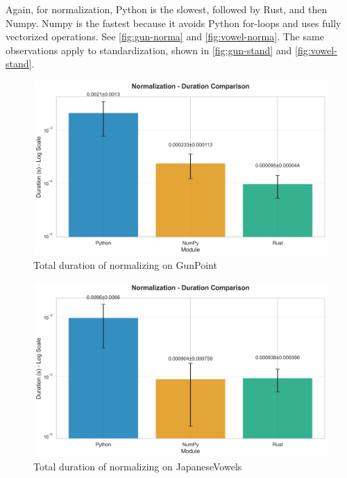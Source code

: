 \documentclass[review]{AIM_report}
\begin{document}
Again, for normalization, Python is the slowest, followed by Rust, and then Numpy. Numpy is the fastest because it avoids Python for-loops and uses fully vectorized operations. See \autoref{fig:gun-norma} and \autoref{fig:vowel-norma}. The same observations apply to standardization, shown in \autoref{fig:gun-stand} and \autoref{fig:vowel-stand}.
\begin{figure}[H]
    \centering
    \includegraphics[width=\figsize\textwidth]{files/benchmarking/methods_gunpoint/normalization_comparison.png}
    \caption{Total duration of normalizing on GunPoint}
    \label{fig:gun-norma}
\end{figure}
\begin{figure}[H]
    \centering
    \includegraphics[width=\figsize\textwidth]{files/benchmarking/methods_vowels/normalization_comparison.png}
    \caption{Total duration of normalizing on JapaneseVowels}
    \label{fig:vowel-norma}
\end{figure}
\end{document}
